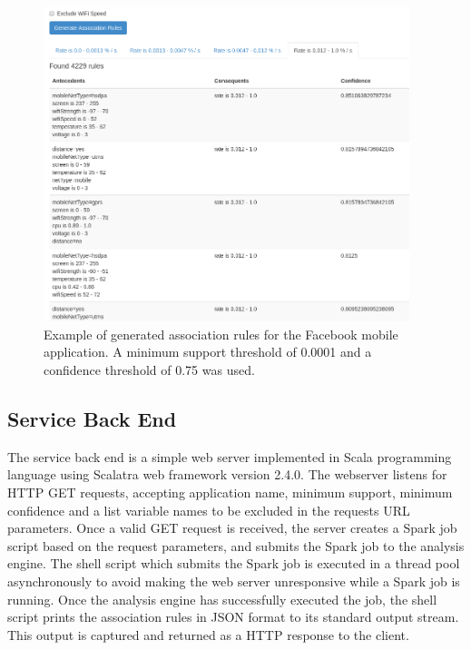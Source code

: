 \begin{figure} %
	\centering
	\includegraphics[width=0.95\textwidth]{images/frontend/frontend_rule_list.png}
	\caption{Example of generated  association rules for the Facebook mobile application. A minimum support threshold of 0.0001 and a confidence threshold of 0.75 was used.}
	\label{figure:frontend-example-rule-list}
\end{figure}

\subsection{Service Back End}

The service back end is a simple web server implemented in Scala programming language using Scalatra web framework version 2.4.0. The webserver listens for HTTP GET requests, accepting application name, minimum support, minimum confidence and a list variable names to be excluded in the requests URL parameters. Once a valid GET request is received, the server creates a Spark job script based on the request parameters, and submits the Spark job to the analysis engine. The shell script which submits the Spark job is executed in a thread pool asynchronously to avoid making the web server unresponsive while a Spark job is running. Once the analysis engine has successfully executed the job, the shell script prints the association rules in JSON format to its standard output stream. This output is captured and returned as a HTTP response to the client.

